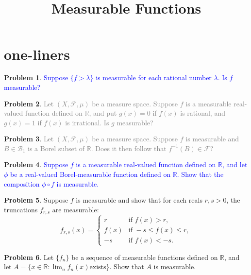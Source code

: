 \documentclass[12pt]{amsart}
\def\field#1{\mathbb{#1}}
\theoremstyle{definition}
\newtheorem{problem}{Problem}
\theoremstyle{remark}
\begin{document}
\title{Measurable Functions}
\maketitle

\section{one-liners}
\begin{problem}
  \textcolor{blue}{Suppose $\{ f > \lambda \}$ is measurable for each
    rational number $\lambda$. Is $f$ measurable?}
\end{problem}
\begin{problem}
  \textcolor{gray}{Let $(X,\mathcal{F},\mu)$ be a measure space.
    Suppose $f$ is a measurable real-valued function defined on
    $\field{R}$, and put $g(x) = 0$ if $f(x)$ is rational, and $g(x) =
    1$ if $f(x)$ is irrational.  Is $g$ measurable?}
\end{problem}
\begin{problem}
  \textcolor{gray}{Let $(X, \mathcal{F}, \mu)$ be a measure space.
    Suppose $f$ is measurable and $B \in \mathcal{B}_1$ is a Borel
    subset of $\field{R}$. Does it then follow that $f^{-1}(B) \in
    \mathcal{F}$?}
\end{problem}
\begin{problem}
  \textcolor{blue}{Suppose $f$ is a measurable real-valued function
    defined on $\field{R}$, and let $\phi$ be a real-valued
    Borel-measurable function defined on $\field{R}$.  Show that the
    composition $\phi \circ f$ is measurable.}
\end{problem}
\begin{problem}
  Suppose $f$ is measurable and show that for each reals $r,s > 0$,
  the truncations $f_{r,s}$ are measurable:
  \begin{equation*}
    f_{r,s} (x) = \begin{cases}
      r &\text{if } f(x) > r, \\
      f(x) &\text{if } -s \leq f(x) \leq r, \\
      -s &\text{if } f(x) < -s.
    \end{cases}
  \end{equation*}
\end{problem}
\begin{problem}
  Let $\{ f_n \}$ be a sequence of measurable functions defined on
  $\field{R}$, and let $A = \{ x \in \field{R} : \lim_n f_n(x) \text{
  exists} \}$.  Show that $A$ is measurable.
\end{problem}
\end{document}
